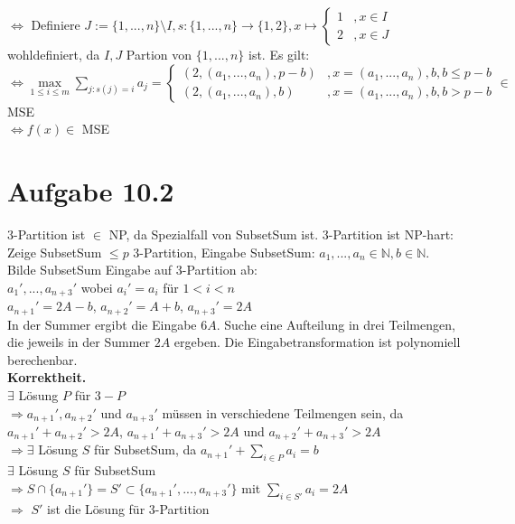 \documentclass{article}
\begin{document}
$\Leftrightarrow$ Definiere $J:=\{1,...,n\} \setminus I, s:\{1,...,n\} \to \{1,2\}, x \mapsto \left\{\begin{array}{cl} 1 & ,x\in I\\ 2 & , x\in J \end{array} \right.$\\

wohldefiniert, da $I,J$ Partion von $\{1,...,n\}$ ist. Es gilt:\\

$\Leftrightarrow\max\limits_{1 \leq i \leq m} \sum\limits_{j:s(j)=i} a_j = \left\{\begin{array}{cl} 
(2,(a_1,...,a_n),p-b)& ,x=(a_1,...,a_n),b,b\leq p-b \\ (2,(a_1,...,a_n),b) & , x=(a_1,...,a_n),b,b >p-b\end{array} \right. \in $MSE\\

$\Leftrightarrow f(x) \in$ MSE
	
\section{Aufgabe 10.2}

3-Partition ist $\in$ NP, da Spezialfall von SubsetSum ist. 3-Partition ist NP-hart:\\
Zeige SubsetSum $\leq p$ 3-Partition, Eingabe SubsetSum: $a_1,...,a_n \in \mathbb{N}, b \in \mathbb{N}$.\\
Bilde SubsetSum Eingabe auf 3-Partition ab:\\

$a_1\prime,...,a_{n+3}\prime$ wobei $a_i\prime=a_i$ für $1<i<n$\\

$a_{n+1}\prime = 2A-b$, $a_{n+2}\prime = A+b$, $a_{n+3}\prime = 2A$\\

In der Summer ergibt die Eingabe $6A$. Suche eine Aufteilung in drei Teilmengen, die jeweils in der Summer $2A$ ergeben. Die Eingabetransformation ist polynomiell berechenbar.\\

\textbf{Korrektheit.}\\

$\exists$ Lösung $P$ für $3-P$\\
$\Rightarrow a_{n+1}\prime, a_{n+2}\prime$ und $a_{n+3}\prime$ müssen in verschiedene Teilmengen sein, da $a_{n+1}\prime+a_{n+2}\prime>2A$, $a_{n+1}\prime+a_{n+3}\prime>2A$ und $a_{n+2}\prime+a_{n+3}\prime>2A$\\
$\Rightarrow \exists$ Lösung $S$ für SubsetSum, da $a_{n+1}\prime+\sum\limits_{i \in P} a_i = b$\\

$\exists$ Lösung $S$ für SubsetSum\\
$\Rightarrow S\cap \{a_{n+1}\prime\}=S\prime \subset \{a_{n+1}\prime,...,a_{n+3}\prime \}$ mit $\sum\limits_{i \in S\prime} a_i=2A$\\
$\Rightarrow$ $S\prime$ ist die Lösung für 3-Partition
	
	
\end{document}
